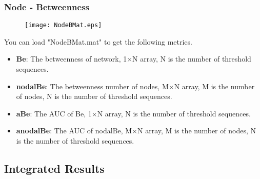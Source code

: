 \documentclass[11pt]{article}
\begin{document}
			\subsubsection{Node - Betweenness}
				\begin{figure}
					\begin{center}
						\texttt{[image: NodeBMat.eps]}
					\end{center}
				\end{figure}
				You can load "NodeBMat.mat" to get the following metrics.
				\begin{itemize}
					\item \textbf{Be}: The betweenness of network,
						1$\times$N array, N is the number of threshold sequences.
					\item \textbf{nodalBe}: The betweenness number of nodes,
						M$\times$N array, M is the number of nodes, N is the number of threshold sequences.
					\item \textbf{aBe}: The AUC of Be,
						1$\times$N array, N is the number of threshold sequences.
					\item \textbf{anodalBe}: The AUC of nodalBe,
						M$\times$N array, M is the number of nodes, N is the number of threshold sequences.
				\end{itemize}
		\subsection{Integrated Results}
\end{document}
